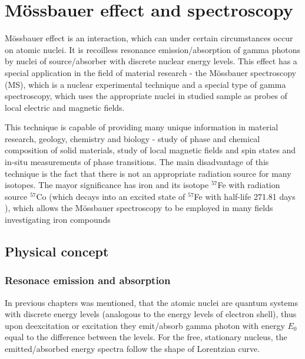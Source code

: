 
\chapter{Mössbauer effect and spectroscopy}
Mössbauer effect is an interaction, which can under certain circumstances occur on atomic nuclei. It is recoilless resonance emission/absorption of gamma photons by nuclei of source/absorber with discrete nuclear energy levels. This effect has a special application in the field of material research - the Mössbauer spectroscopy (MS), which is a nuclear experimental technique and a special type of gamma spectroscopy, which uses the appropriate nuclei in studied sample as probes of local electric and magnetic fields. 

\par
This technique is capable of providing many unique information in material research, geology, chemistry and biology - study of phase and chemical composition of solid materials, study of local magnetic fields and spin states and in-situ measurements of phase transitions. The main disadvantage of this technique is the fact that there is not an appropriate radiation source for many isotopes. The mayor significance has iron and its isotope $^{57}$Fe with radiation source $^{57}$Co (which decays into an excited state of $^{57}$Fe with half-life 271.81 days \cite{co57}), which allows the Mössbauer spectroscopy to be employed in many fields investigating iron compounds

\section{Physical concept}

\subsection{Resonace emission and absorption}
In previous chapters was mentioned, that the atomic nuclei are quantum systems with discrete energy levels (analogous to the energy levels of electron shell), thus upon deexcitation or excitation they emit/absorb gamma photon with energy $E_0$ equal to the difference between the levels. For the free, stationary nucleus, the emitted/absorbed energy spectra follow the shape of Lorentzian curve. 

